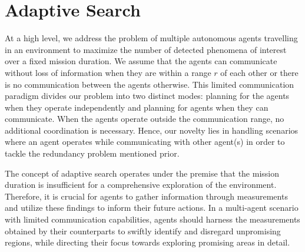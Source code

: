 \documentclass[letterpaper, 10 pt, conference]{IEEEConference}
\begin{document}






\section{Adaptive Search} \label{Adaptive Search}

At a high level, we address the problem of multiple autonomous agents travelling in an environment to maximize the number of detected phenomena of interest over a fixed mission duration. We assume that the agents can communicate without loss of information when they are within a range $r$ of each other or there is no communication between the agents otherwise. This limited communication paradigm divides our problem into two distinct modes: planning for the agents when they operate independently and planning for agents when they can communicate. When the agents operate outside the communication range, no additional coordination is necessary. Hence, our novelty lies in handling scenarios where an agent operates while communicating with other agent(s) in order to tackle the redundancy problem mentioned prior.

The concept of adaptive search operates under the premise that the mission duration is insufficient for a comprehensive exploration of the environment. Therefore, it is crucial for agents to gather information through measurements and utilize these findings to inform their future actions. In a multi-agent scenario with limited communication capabilities, agents should harness the measurements obtained by their counterparts to swiftly identify and disregard unpromising regions, while directing their focus towards exploring promising areas in detail. 
\end{document}
